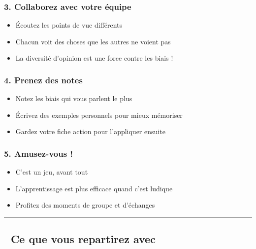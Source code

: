 \documentclass[
]{article}
\providecommand{\tightlist}{%
  \setlength{\itemsep}{0pt}\setlength{\parskip}{0pt}}
\begin{document}
\subsubsection{\texorpdfstring{\textbf{3. Collaborez avec votre
équipe}}{3. Collaborez avec votre équipe}}\label{collaborez-avec-votre-uxe9quipe}

\begin{itemize}
\tightlist
\item
  Écoutez les points de vue différents
\item
  Chacun voit des choses que les autres ne voient pas
\item
  La diversité d'opinion est une force contre les biais !
\end{itemize}

\subsubsection{\texorpdfstring{\textbf{4. Prenez des
notes}}{4. Prenez des notes}}\label{prenez-des-notes}

\begin{itemize}
\tightlist
\item
  Notez les biais qui vous parlent le plus
\item
  Écrivez des exemples personnels pour mieux mémoriser
\item
  Gardez votre fiche action pour l'appliquer ensuite
\end{itemize}

\subsubsection{\texorpdfstring{\textbf{5. Amusez-vous
!}}{5. Amusez-vous !}}\label{amusez-vous}

\begin{itemize}
\tightlist
\item
  C'est un jeu, avant tout
\item
  L'apprentissage est plus efficace quand c'est ludique
\item
  Profitez des moments de groupe et d'échanges
\end{itemize}

\begin{center}\rule{0.5\linewidth}{0.5pt}\end{center}

\subsection{📝 Ce que vous repartirez
avec}\label{ce-que-vous-repartirez-avec}
\end{document}
